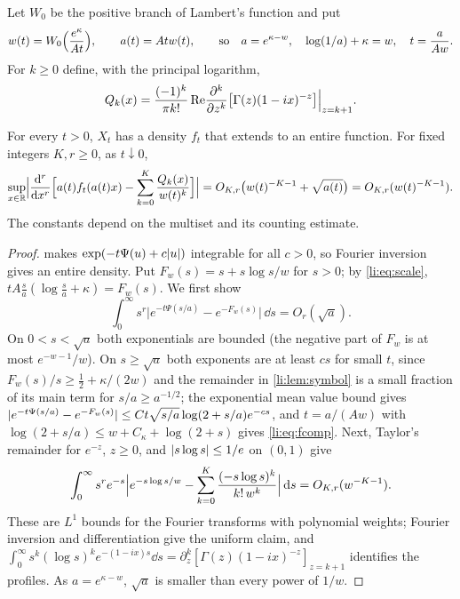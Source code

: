 Let $W_0$ be the positive branch of Lambert's function and put
\begin{equation}\label{li:eq:scale}
 w(t)=W_0\Bigl(\frac{e^\kappa}{At}\Bigr),\qquad a(t)=Atw(t),\qquad\text{so}\quad a=e^{\kappa-w},\quad
 \log(1/a)+\kappa=w,\quad t=\frac a{Aw}.
\end{equation}
For $k\ge0$ define, with the principal logarithm,
\begin{equation}\label{li:eq:profiles}
 Q_k(x)=\frac{(-1)^k}{\pi k!}\Re\Bigl.\frac{\partial^k}{\partial z^k}\bigl[\Gamma(z)(1-ix)^{-z}\bigr]\Bigr|_{z=k+1}.
\end{equation}

\begin{theorem}\label{li:thm:allorders}
For every $t>0$, $X_t$ has a density $f_t$ that extends to an entire function. For fixed integers
$K,r\ge0$, as $t\downarrow0$,
\[
 \sup_{x\in\R}\Bigl|\frac{\dd^r}{\dd x^r}\Bigl[a(t)f_t(a(t)x)-\sum_{k=0}^K\frac{Q_k(x)}{w(t)^k}\Bigr]\Bigr|
 =O_{K,r}\bigl(w(t)^{-K-1}+\sqrt{a(t)}\bigr)=O_{K,r}(w(t)^{-K-1}).
\]
The constants depend on the multiset and its counting estimate.
\end{theorem}

\begin{proof}
 makes $\exp(-t\Psi(u)+c\abs u)$ integrable for all $c>0$, so Fourier inversion
gives an entire density. Put $F_w(s)=s+s\log s/w$ for $s>0$; by \eqref{li:eq:scale},
$tA\frac sa(\log\frac sa+\kappa)=F_w(s)$. We first show
\begin{equation}\label{li:eq:fcomp}
 \int_0^\infty s^r\bigl|e^{-t\Psi(s/a)}-e^{-F_w(s)}\bigr|\,\dd s=O_r(\sqrt a).
\end{equation}
On $0<s<\sqrt a$ both exponentials are bounded (the negative part of $F_w$ is at most $e^{-w-1}/w$).
On $s\ge\sqrt a$ both exponents are at least $cs$ for small $t$, since $F_w(s)/s\ge\frac12+\kappa/(2w)$
and the remainder in \cref{li:lem:symbol} is a small fraction of its main term for
$s/a\ge a^{-1/2}$; the exponential mean value bound gives
$\abs{e^{-t\Psi(s/a)}-e^{-F_w(s)}}\le Ct\sqrt{s/a}\log(2+s/a)e^{-cs}$, and $t=a/(Aw)$ with
$\log(2+s/a)\le w+C_\kappa+\log(2+s)$ gives \eqref{li:eq:fcomp}. Next, Taylor's remainder for
$e^{-z}$, $z\ge0$, and $\abs{s\log s}\le1/e$ on $(0,1)$ give
\[
 \int_0^\infty s^re^{-s}\Bigl|e^{-s\log s/w}-\sum_{k=0}^K\frac{(-s\log s)^k}{k!\,w^k}\Bigr|\,\dd s=O_{K,r}(w^{-K-1}).
\]
These are $L^1$ bounds for the Fourier transforms with polynomial weights; Fourier inversion and
differentiation give the uniform claim, and
$\int_0^\infty s^k(\log s)^ke^{-(1-ix)s}\dd s=\partial_z^k[\Gamma(z)(1-ix)^{-z}]_{z=k+1}$ identifies the
profiles. As $a=e^{\kappa-w}$, $\sqrt a$ is smaller than every power of $1/w$.
\end{proof}

